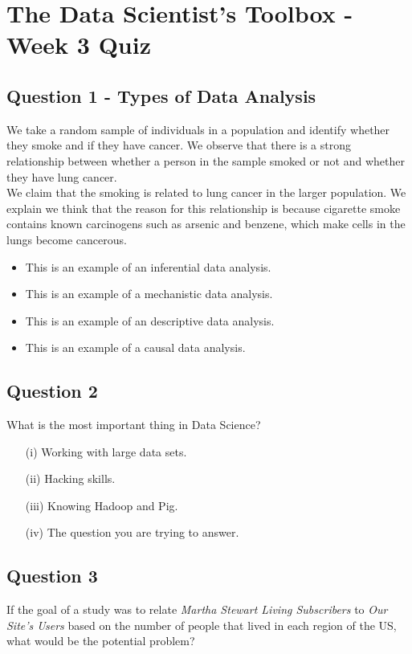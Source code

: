 \documentclass[12pt]{article}
\begin{document}
	
	\section*{The Data Scientist’s Toolbox - Week 3 Quiz}
	
	
	\subsection*{Question 1 - Types of Data Analysis}
We take a random sample of individuals in a population and identify whether they smoke and if they have cancer. We observe that there is a strong relationship between whether a person in the sample smoked or not and whether they have lung cancer. \\

\bigskip
\noindent We claim that the smoking is related to lung cancer in the larger population. We explain we think that the reason for this relationship is because cigarette smoke contains known carcinogens such as arsenic and benzene, which make cells in the lungs become cancerous.
\begin{itemize}
\item This is an example of an inferential data analysis.
\item This is an example of a mechanistic data analysis.
\item This is an example of an descriptive data analysis.
\item This is an example of a causal data analysis.
\end{itemize}
\subsection*{Question 2}
What is the most important thing in Data Science?
\begin{itemize}
\item[(i)] Working with large data sets.
\item[(ii)] Hacking skills.
\item[(iii)] Knowing Hadoop and Pig.
\item[(iv)] The question you are trying to answer.
\end{itemize}
\newpage
\subsection*{Question 3}
If the goal of a study was to relate \textit{Martha Stewart Living Subscribers} to \textit{Our Site's Users} based on the number of people that lived in each region of the US, what would be the potential problem? 
\end{document}
